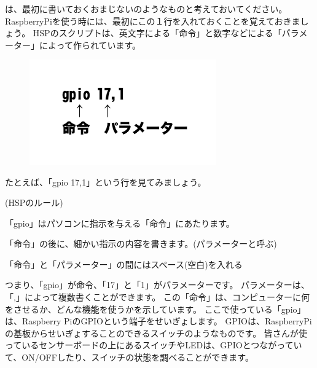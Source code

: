 \noindent
は、最初に書いておくおまじないのようなものと考えておいてください。
RaspberryPiを使う時には、最初にこの１行を入れておくことを覚えておきましょう。
HSPのスクリプトは、英文字による「命令」と数字などによる「パラメーター」によって作られています。

\begin{figure}[H]
    \begin{center}
        \includegraphics[keepaspectratio,width=8.017cm,height=4.512cm]{text02-img/text02-img024.png}
    \end{center}
\end{figure}

たとえば、「gpio 17,1」という行を見てみましょう。

\begin{description}
    \item (HSPのルール)
\end{description}

\begin{description}
    \item 「gpio」はパソコンに指示を与える「命令」にあたります。
    \item 「命令」の後に、細かい指示の内容を書きます。(パラメーターと呼ぶ)
    \item 「命令」と「パラメーター」の間にはスペース(空白)を入れる
\end{description}
\noindent
つまり、「gpio」が命令、「17」と「1」がパラメーターです。
パラメーターは、「,」によって複数書くことができます。
この「命令」は、コンピューターに何をさせるか、どんな機能を使うかを示しています。
ここで使っている「gpio」は、Raspberry PiのGPIOという端子をせいぎょします。
GPIOは、RaspberryPiの基板からせいぎょすることのできるスイッチのようなものです。
皆さんが使っているセンサーボードの上にあるスイッチやLEDは、GPIOとつながっていて、ON/OFFしたり、スイッチの状態を調べることができます。

